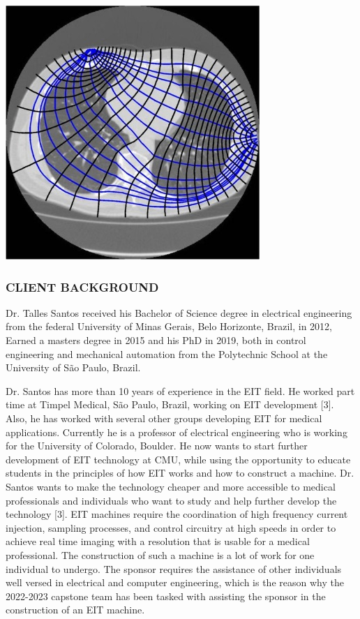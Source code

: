 \documentclass[12pt]{article}
\begin{document}
\includegraphics{media/image3.jpeg}

\subsubsection{CLIENT BACKGROUND}\label{client-background}

Dr. Talles Santos received his Bachelor of Science degree in electrical
engineering from the federal University of Minas Gerais, Belo Horizonte,
Brazil, in 2012, Earned a master\textquotesingle s degree in 2015 and
his PhD in 2019, both in control engineering and mechanical automation
from the Polytechnic School at the University of São Paulo, Brazil.

Dr. Santos has more than 10 years of experience in the EIT field. He
worked part time at Timpel Medical, São Paulo, Brazil, working on EIT
development {[}3{]}. Also, he has worked with several other groups
developing EIT for medical applications. Currently he is a professor of
electrical engineering who is working for the University of Colorado,
Boulder. He now wants to start further development of EIT technology at
CMU, while using the opportunity to educate students in the principles
of how EIT works and how to construct a machine. Dr. Santos wants to
make the technology cheaper and more accessible to medical professionals
and individuals who want to study and help further develop the
technology {[}3{]}. EIT machines require the coordination of high
frequency current injection, sampling processes, and control circuitry
at high speeds in order to achieve real time imaging with a resolution
that is usable for a medical professional. The construction of such a
machine is a lot of work for one individual to undergo. The sponsor
requires the assistance of other individuals well versed in electrical
and computer engineering, which is the reason why the 2022-2023 capstone
team has been tasked with assisting the sponsor in the construction of
an EIT machine.
\end{document}
